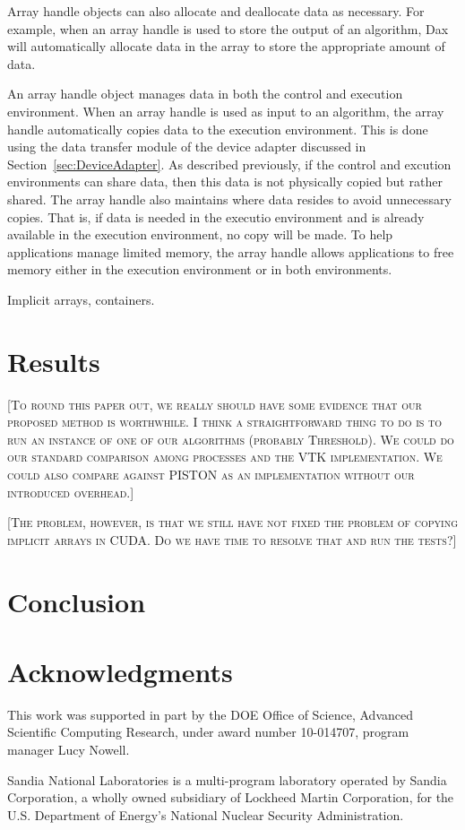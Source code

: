 \documentclass[conference]{IEEEtran}
\newcommand{\fix}[1]{{\color{red}\textsc{[#1]}}}
\begin{document}
Array handle objects can also allocate and deallocate data as necessary.
For example, when an array handle is used to store the output of an
algorithm, Dax will automatically allocate data in the array to store the
appropriate amount of data.

An array handle object manages data in both the control and execution
environment.  When an array handle is used as input to an algorithm, the
array handle automatically copies data to the execution environment.  This
is done using the data transfer module of the device adapter discussed in
Section~\ref{sec:DeviceAdapter}.  As described previously, if the control
and excution environments can share data, then this data is not physically
copied but rather shared.  The array handle also maintains where data
resides to avoid unnecessary copies.  That is, if data is needed in the
executio environment and is already available in the execution environment,
no copy will be made.  To help applications manage limited memory, the
array handle allows applications to free memory either in the execution
environment or in both environments.

Implicit arrays, containers.

\section{Results}

\noindent
\fix{To round this paper out, we really should have some evidence that our
  proposed method is worthwhile.  I think a straightforward thing to do is
  to run an instance of one of our algorithms (probably Threshold).  We
  could do our standard comparison among processes and the VTK
  implementation.  We could also compare against PISTON as an
  implementation without our introduced overhead.}

\fix{The problem, however, is that we still have not fixed the problem of
  copying implicit arrays in CUDA.  Do we have time to resolve that and run
  the tests?}

\section{Conclusion}
\label{sec:Conclusion}

\noindent

\section*{Acknowledgments}

\noindent
This work was supported in part by the DOE Office of Science, Advanced
Scientific Computing Research, under award number 10-014707, program
manager Lucy Nowell.

Sandia National Laboratories is a multi-program laboratory operated by
Sandia Corporation, a wholly owned subsidiary of Lockheed Martin
Corporation, for the U.S. Department of Energy's National Nuclear Security
Administration.



\end{document}
